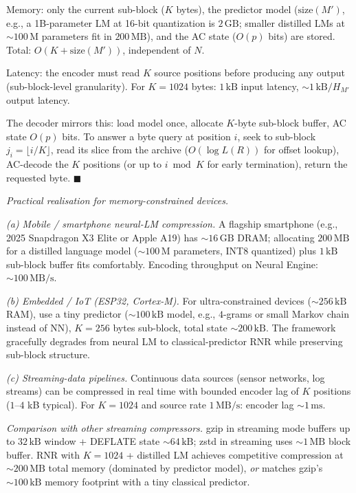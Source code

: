\documentclass[
]{article}
\begin{document}
Memory: only the current sub-block ($K$ bytes), the predictor model
($\mathrm{size}(M')$, e.g., a 1B-parameter LM at 16-bit quantization
is $2\,\mathrm{GB}$; smaller distilled LMs at $\sim 100\,\mathrm{M}$
parameters fit in $200\,\mathrm{MB}$), and the AC state ($O(p)$ bits)
are stored. Total: $O(K + \mathrm{size}(M'))$, independent of $N$.

Latency: the encoder must read $K$ source positions before producing
any output (sub-block-level granularity). For $K = 1024$ bytes:
$1\,\mathrm{kB}$ input latency, $\sim 1\,\mathrm{kB} / H_{M'}$ output
latency.

The decoder mirrors this: load model once, allocate $K$-byte sub-block
buffer, AC state $O(p)$ bits. To answer a byte query at position $i$,
seek to sub-block $j_i = \lfloor i/K \rfloor$, read its slice from the
archive ($O(\log L(R))$ for offset lookup), AC-decode the $K$ positions
(or up to $i \bmod K$ for early termination), return the requested byte.
\hfill$\blacksquare$

\emph{Practical realisation for memory-constrained devices.}

\emph{(a) Mobile / smartphone neural-LM compression.} A flagship
smartphone (e.g., 2025 Snapdragon X3 Elite or Apple A19) has
$\sim 16\,\mathrm{GB}$ DRAM; allocating $200\,\mathrm{MB}$ for a
distilled language model ($\sim 100\,\mathrm{M}$ parameters, INT8
quantized) plus $1\,\mathrm{kB}$ sub-block buffer fits comfortably.
Encoding throughput on Neural Engine: $\sim 100\,\mathrm{MB/s}$.

\emph{(b) Embedded / IoT (ESP32, Cortex-M).} For ultra-constrained
devices ($\sim 256\,\mathrm{kB}$ RAM), use a tiny predictor ($\sim
100\,\mathrm{kB}$ model, e.g., $4$-grams or small Markov chain instead
of NN), $K = 256$ bytes sub-block, total state $\sim 200\,\mathrm{kB}$.
The framework gracefully degrades from neural LM to
classical-predictor RNR while preserving sub-block structure.

\emph{(c) Streaming-data pipelines.} Continuous data sources (sensor
networks, log streams) can be compressed in real time with bounded
encoder lag of $K$ positions ($1$--$4$ kB typical). For $K = 1024$
and source rate $1\,\mathrm{MB/s}$: encoder lag $\sim 1\,\mathrm{ms}$.

\emph{Comparison with other streaming compressors.} gzip in streaming
mode buffers up to $32\,\mathrm{kB}$ window + DEFLATE state $\sim
64\,\mathrm{kB}$; zstd in streaming uses $\sim 1\,\mathrm{MB}$ block
buffer. RNR with $K = 1024$ + distilled LM achieves competitive
compression at $\sim 200\,\mathrm{MB}$ total memory (dominated by
predictor model), \emph{or} matches gzip's $\sim 100\,\mathrm{kB}$
memory footprint with a tiny classical predictor.
\end{document}
